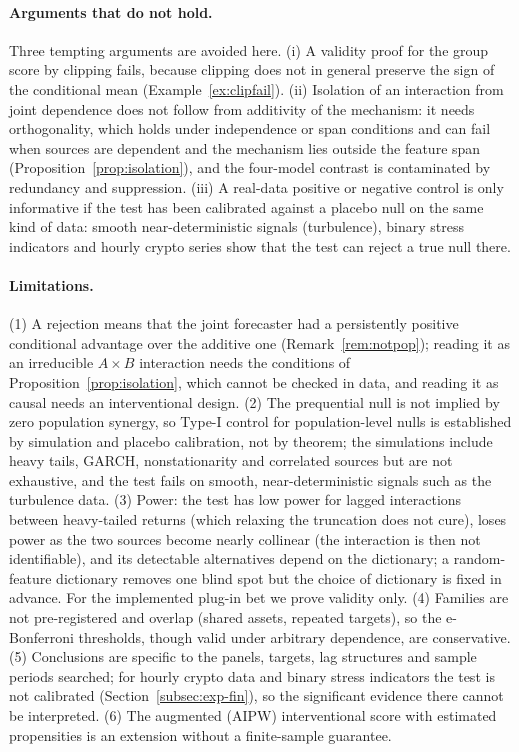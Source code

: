 \documentclass[pdflatex,sn-mathphys-ay]{sn-jnl}%
\theoremstyle{thmstyleone}%
\theoremstyle{thmstyletwo}%
\theoremstyle{thmstylethree}%
\begin{document}
\paragraph{Arguments that do not hold.} Three tempting arguments are avoided here. (i) A validity proof for the group score by clipping fails, because clipping does not in general preserve the sign of the conditional mean
(Example~\ref{ex:clipfail}). (ii) Isolation of an interaction from joint dependence does not follow from additivity of the mechanism: it needs orthogonality, which holds under independence or span conditions and can fail when sources are dependent and the mechanism lies outside the feature span (Proposition~\ref{prop:isolation}),
and the four-model contrast is contaminated by redundancy and suppression. (iii) A real-data positive or negative control is only informative if the test has been calibrated against a placebo null on the same kind of data: smooth near-deterministic signals (turbulence), binary stress indicators and hourly crypto series show that the test can reject a true null there.

\paragraph{Limitations.} (1) A rejection means that the joint forecaster had a persistently positive conditional advantage over the additive one (Remark~\ref{rem:notpop}); reading it as an irreducible $A\times B$ interaction needs the conditions of Proposition~\ref{prop:isolation}, which cannot be checked in data, and reading it as causal needs an
interventional design. (2) The prequential null is not implied by zero population synergy, so Type-I control for population-level nulls is established by simulation and placebo calibration, not by theorem; the simulations include heavy tails, GARCH, nonstationarity and correlated sources but are not exhaustive, and the test fails on smooth, near-deterministic signals such as the turbulence data.
(3) Power: the test has low power for lagged interactions between heavy-tailed returns (which relaxing the truncation does not cure), loses power as the two sources become nearly collinear (the interaction is then not identifiable), and its detectable alternatives depend on the dictionary; a random-feature dictionary removes one blind spot but the choice of dictionary is fixed in advance. For the implemented plug-in bet we prove validity only.
(4) Families are not pre-registered and overlap (shared assets, repeated targets), so the e-Bonferroni thresholds, though valid under arbitrary dependence, are conservative. (5) Conclusions are specific to the panels, targets, lag structures and sample periods searched; for hourly crypto data and binary stress indicators the test is not calibrated (Section~\ref{subsec:exp-fin}), so the significant evidence there cannot be interpreted. (6) The augmented (AIPW) interventional score with estimated propensities is an extension without a finite-sample guarantee.
\end{document}
